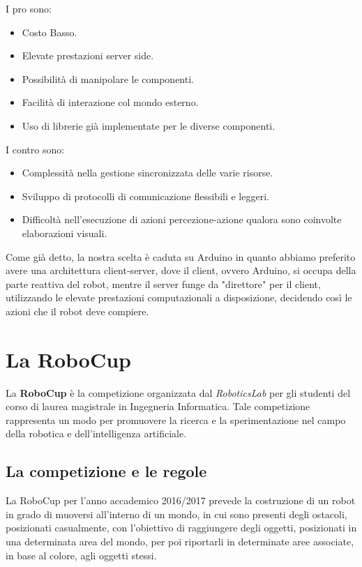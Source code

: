 \documentclass[a4paper,12pt,italian]{article}
\begin{document}
I pro sono:
\begin{itemize}
	\item Costo Basso.
	\item Elevate prestazioni server side. 
	\item Possibilità di manipolare le componenti. 
	\item Facilità di interazione col mondo esterno. 
	\item Uso di librerie già implementate per le diverse componenti. 
\end{itemize}

I contro sono:
\begin{itemize}
	\item Complessità nella gestione sincronizzata delle varie risorse.
	\item Sviluppo di protocolli di comunicazione flessibili e leggeri.
	\item Difficoltà nell’esecuzione di azioni percezione-azione qualora sono coinvolte elaborazioni visuali. 
\end{itemize}

Come già detto, la nostra scelta è caduta su Arduino in quanto abbiamo preferito avere una architettura client-server, dove il client, ovvero Arduino, si occupa della parte reattiva del robot, mentre il server funge da "direttore" per il client, utilizzando le elevate prestazioni computazionali a disposizione, decidendo così le azioni che il robot deve compiere.

\section{La RoboCup}

La \textbf{RoboCup} è la competizione organizzata dal \textit{RoboticsLab} per gli studenti del corso di laurea magistrale in Ingegneria Informatica. Tale competizione rappresenta un modo per promuovere la ricerca e la sperimentazione nel campo della robotica e dell'intelligenza artificiale. 


\subsection{La competizione e le regole}

La RoboCup per l'anno accademico 2016/2017 prevede la costruzione di un robot in grado di muoversi all'interno di un mondo, in cui sono presenti degli ostacoli, posizionati casualmente, con l'obiettivo di raggiungere degli oggetti, posizionati in una determinata area del mondo, per poi riportarli in determinate aree associate, in base al colore, agli oggetti stessi.
\end{document}
